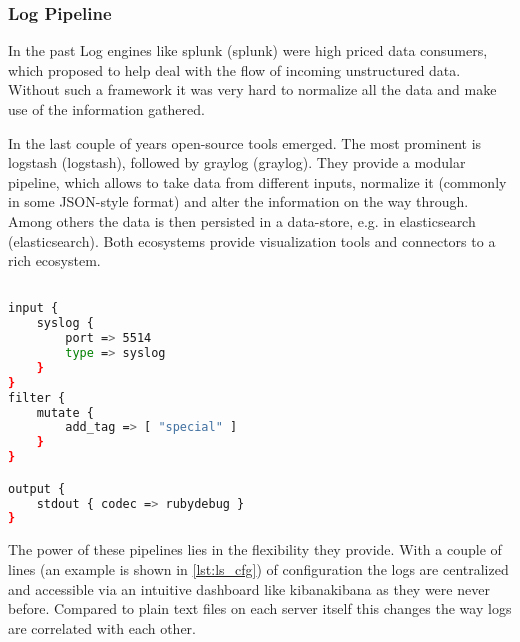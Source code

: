 \subsubsection{Log Pipeline}
In the past Log engines like \gls{splunk} (\glsdesc{splunk}) were high priced data consumers, which proposed to help deal with the
flow of incoming unstructured data. Without such a framework it was very hard to normalize all the data and make use of the information gathered.

In the last couple of years open-source tools emerged. The most prominent is \gls{logstash} (\glsdesc{logstash}),
followed by \gls{graylog} (\glsdesc{graylog}).
They provide a modular pipeline, which allows to take data from different inputs, normalize it (commonly in some JSON-style format)
and alter the information on the way through. Among others the data is then persisted in a data-store, e.g. in \gls{elasticsearch} (\glsdesc{elasticsearch}).
Both ecosystems provide visualization tools and connectors to a rich ecosystem.

\begin{lstlisting}[language=bash,label={lst:ls_cfg},
    caption={Basic Logstash configuration}]

input {
    syslog {
        port => 5514
        type => syslog
    }
}
filter {
    mutate {
        add_tag => [ "special" ]
    }
}

output {
    stdout { codec => rubydebug }
}
\end{lstlisting}

The power of these pipelines lies in the flexibility they provide. With a couple of lines (an example is shown in \autoref{lst:ls_cfg}) of
configuration the logs are centralized and accessible via an intuitive dashboard like \gls{kibana}\glsdesc{kibana} as they were never before. Compared to plain text files on each server itself this changes the way logs are correlated with each other.

